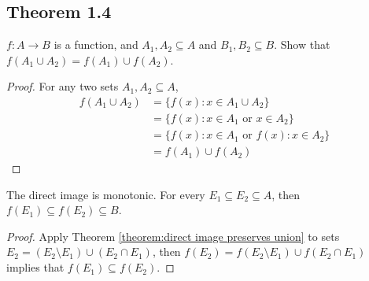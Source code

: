 \documentclass[../../main.tex]{subfiles}
\begin{document}
\subsection{Theorem 1.4}
\begin{wts}\label{theorem:direct image preserves union}
   $f: A \to B$ is a function, and $A_1, A_2\subseteq A$ and $B_1, B_2\subseteq B$. Show that $f(A_1\cup A_2) = f(A_1)\cup f(A_2)$.
\end{wts}

\begin{proof}
    For any two sets $A_1, A_2\subseteq A$,
    \begin{align*}
        f(A_1\cup A_2)&= \{f(x): x\in A_1\cup A_2\}\\
        &=\{f(x): x\in A_1 \text{ or } x\in A_2\}\\
        &= \{f(x): x\in A_1 \text{ or } f(x): x\in A_2\}\\
        &= f(A_1)\cup f(A_2)
    \end{align*}
\end{proof} %
\begin{corollary}\label{corollary:direct_image_monotonic}
        The direct image is monotonic. For every $E_1\subseteq E_2\subseteq A$, then $f(E_1)\subseteq f(E_2)\subseteq B$.
    \begin{proof}
        Apply Theorem \ref{theorem:direct image preserves union} to sets $E_2 = (E_2\setminus E_1) \cup (E_2\cap E_1)$, then $f(E_2) = f(E_2\setminus E_1)\cup f(E_2\cap E_1)$ implies that  $f(E_1)\subseteq f(E_2)$.
    \end{proof}
\end{corollary}
\end{document}
